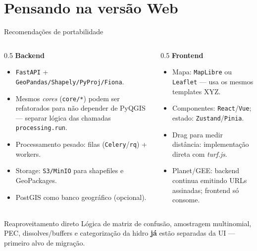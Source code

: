 \documentclass[10pt,aspectratio=169]{beamer}
\begin{document}
\section{Pensando na versão Web}
\begin{frame}{Recomendações de portabilidade}
  \begin{columns}[T,onlytextwidth]
    \begin{column}{0.5\textwidth}
      \textbf{Backend}
      \begin{itemize}
        \item \texttt{FastAPI} + \texttt{GeoPandas/Shapely/PyProj/Fiona}.
        \item Mesmos \emph{cores} (\texttt{core/*}) podem ser refatorados para não depender de PyQGIS — separar lógica das chamadas \texttt{processing.run}.
        \item Processamento pesado: filas (\texttt{Celery}/\texttt{rq}) + workers.
        \item Storage: \texttt{S3/MinIO} para shapefiles e GeoPackages.
        \item PostGIS como banco geográfico (opcional).
      \end{itemize}
    \end{column}
    \begin{column}{0.5\textwidth}
      \textbf{Frontend}
      \begin{itemize}
        \item Mapa: \texttt{MapLibre} ou \texttt{Leaflet} — usa os mesmos templates XYZ.
        \item Componentes: \texttt{React}/\texttt{Vue}; estado: \texttt{Zustand}/\texttt{Pinia}.
        \item Drag para medir distância: implementação direta com \emph{turf.js}.
        \item Planet/GEE: backend continua emitindo URLs assinadas; frontend só consome.
      \end{itemize}
    \end{column}
  \end{columns}
  \vfill
  \begin{alertblock}{Reaproveitamento direto}
    Lógica de matriz de confusão, amostragem multinomial, PEC, dissolves/buffers e categorização da hidro \textbf{já} estão separadas da UI — primeiro alvo de migração.
  \end{alertblock}
\end{frame}
\end{document}
